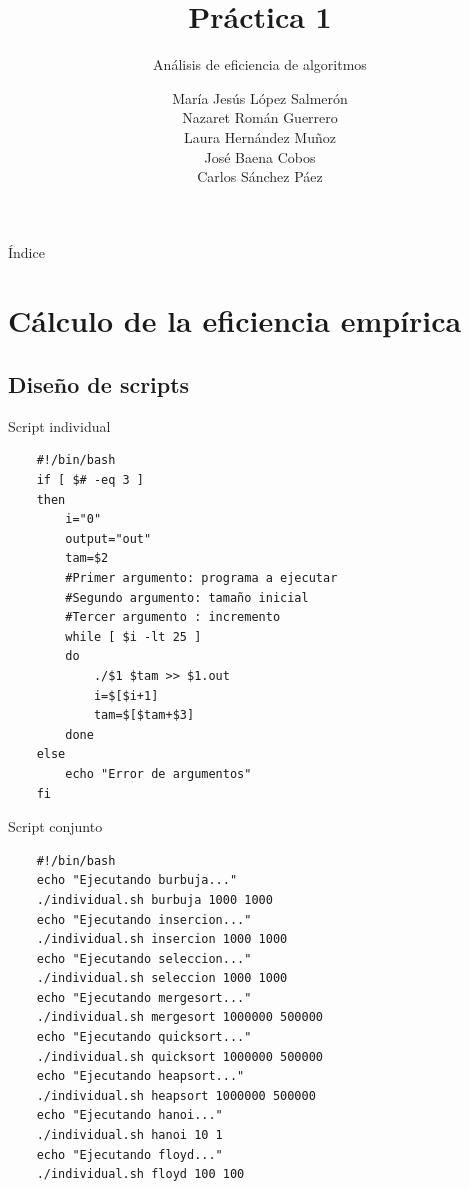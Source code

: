 \documentclass{beamer}
\title{Práctica 1}
\subtitle{Análisis de eficiencia de algoritmos}
\author{María Jesús López Salmerón \\ Nazaret Román Guerrero \\ Laura Hernández Muñoz \\ José Baena Cobos  \\ Carlos Sánchez Páez}
\begin{document}
\begin{frame}
  \titlepage
\end{frame}

\begin{frame}{Índice}
  \tableofcontents
\end{frame}

\section{Cálculo de la eficiencia empírica}

\subsection{Diseño de scripts}

\begin{frame}[fragile]{Script individual}

\begin{verbatim}
	#!/bin/bash
	if [ $# -eq 3 ]
	then
		i="0"
		output="out"
		tam=$2
		#Primer argumento: programa a ejecutar
		#Segundo argumento: tamaño inicial
		#Tercer argumento : incremento
		while [ $i -lt 25 ]
		do
			./$1 $tam >> $1.out
			i=$[$i+1]
			tam=$[$tam+$3]
		done
	else
		echo "Error de argumentos"
	fi
\end{verbatim}  
\end{frame}

\begin{frame}[fragile]{Script conjunto}

\begin{verbatim}
	#!/bin/bash
	echo "Ejecutando burbuja..."
	./individual.sh burbuja 1000 1000
	echo "Ejecutando insercion..."
	./individual.sh insercion 1000 1000
	echo "Ejecutando seleccion..."
	./individual.sh seleccion 1000 1000
	echo "Ejecutando mergesort..."
	./individual.sh mergesort 1000000 500000
	echo "Ejecutando quicksort..."
	./individual.sh quicksort 1000000 500000
	echo "Ejecutando heapsort..."
	./individual.sh heapsort 1000000 500000
	echo "Ejecutando hanoi..."
	./individual.sh hanoi 10 1
	echo "Ejecutando floyd..."
	./individual.sh floyd 100 100
\end{verbatim}  
\end{frame}
\end{document}
